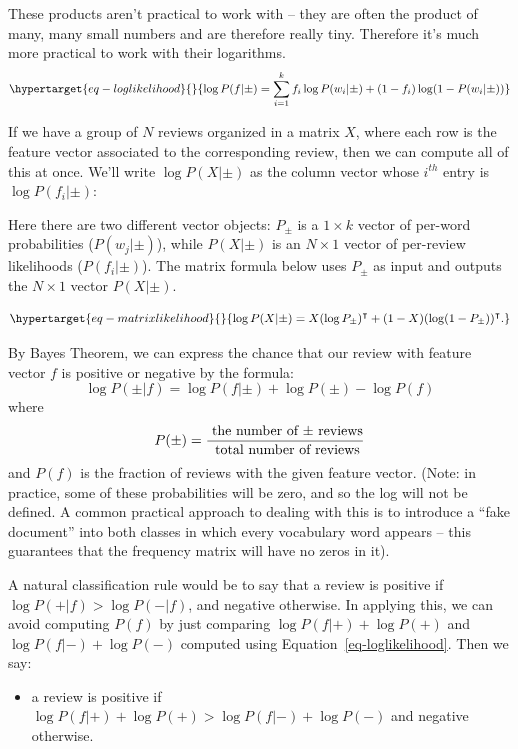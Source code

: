 \documentclass[
  11pt,
  letterpaper,
]{scrbook}
\providecommand{\tightlist}{%
  \setlength{\itemsep}{0pt}\setlength{\parskip}{0pt}}\usepackage{longtable,booktabs,array}
\theoremstyle{plain}
\theoremstyle{remark}
\begin{document}
These products aren't practical to work with -- they are often the
product of many, many small numbers and are therefore really tiny.
Therefore it's much more practical to work with their logarithms.
\begin{equation}\protect\hypertarget{eq-loglikelihood}{}{
\log P(f|\pm) = \sum_{i=1}^{k} f_{i}\log P(w_{i}|\pm) + (1-f_{i})\log(1-P(w_{i}|\pm))
}\label{eq-loglikelihood}\end{equation}

If we have a group of \(N\) reviews organized in a matrix \(X\), where
each row is the feature vector associated to the corresponding review,
then we can compute all of this at once. We'll write \(\log P(X|\pm)\)
as the column vector whose \(i^{th}\) entry is \(\log P(f_{i}|\pm)\):

Here there are two different vector objects: \(P_{\pm}\) is a
\(1\times k\) vector of per-word probabilities (\(P(w_j|\pm)\)), while
\(P(X|\pm)\) is an \(N\times 1\) vector of per-review likelihoods
(\(P(f_i|\pm)\)). The matrix formula below uses \(P_{\pm}\) as input and
outputs the \(N\times 1\) vector \(P(X|\pm)\).

\begin{equation}\protect\hypertarget{eq-matrixlikelihood}{}{
\log P(X|\pm) = X(\log P_{\pm})^{\intercal}+(1-X)(\log (1-P_{\pm}))^{\intercal}.
}\label{eq-matrixlikelihood}\end{equation}

By Bayes Theorem, we can express the chance that our review with feature
vector \(f\) is positive or negative by the formula: \[
\log P(\pm|f) = \log P(f|\pm)+\log P(\pm) - \log P(f)
\] where \[
P(\pm) = \frac{\hbox{ the number of $\pm$ reviews}}{\hbox{ total number of reviews}}
\] and \(P(f)\) is the fraction of reviews with the given feature
vector. (Note: in practice, some of these probabilities will be zero,
and so the log will not be defined. A common practical approach to
dealing with this is to introduce a ``fake document'' into both classes
in which every vocabulary word appears -- this guarantees that the
frequency matrix will have no zeros in it).

A natural classification rule would be to say that a review is positive
if \(\log P(+|f)>\log P(-|f)\), and negative otherwise. In applying
this, we can avoid computing \(P(f)\) by just comparing
\(\log P(f|+)+\log P(+)\) and \(\log P(f|-)+\log P(-)\) computed using
Equation~\ref{eq-loglikelihood}. Then we say:

\begin{itemize}
\tightlist
\item
  a review is positive if
  \(\log P(f|+)+\log P(+)>\log P(f|-)+\log P(-)\) and negative
  otherwise.
\end{itemize}
\end{document}
